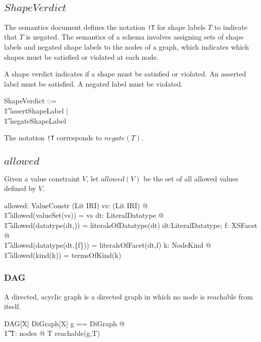 \documentclass{article}
\begin{document}
\subsection{$ShapeVerdict$}
The semantics document defines the notation {\tt !T} for shape labels $T$ to indicate that $T$ is negated.
The semantics of a schema involves assigning sets of shape labels and negated shape labels to the nodes of a graph, 
which indicates which shapes must be satisfied or violated at each node. 

A shape verdict indicates if a shape must be satisfied or violated.
An asserted label must be satisfied.
A negated label must be violated.
\begin{zed}
	ShapeVerdict ::= \\
\t1		assert\ldata ShapeLabel \rdata | \\
\t1		negate\ldata ShapeLabel \rdata
\end{zed}

The notation {\tt !T} corresponds to $negate(T)$.

\subsection{$allowed$}
Given a value constraint $V$, let $allowed(V)$ be the set of all allowed values defined by $V$.
\begin{axdef}
	allowed: ValueConstr \fun \power (Lit \cup IRI)
\where
	\forall vs: \power (Lit \cup IRI) @ \\
\t1		allowed(valueSet(vs)) = vs
\also
	\forall dt: LiteralDatatype @ \\
\t1		allowed(datatype(dt,\emptyset)) = literalsOfDatatype(dt)
\also
	\forall dt:LiteralDatatype; f: XSFacet @ \\
\t1		allowed(datatype(dt,\{f\})) = literalsOfFacet(dt,f)
\also
	\forall k: NodeKind @ \\
\t1		allowed(kind(k)) = termsOfKind(k)
\end{axdef}

\subsubsection{DAG}
A directed, acyclic graph is a directed graph in which no node is reachable from itself.
\begin{schema}{DAG}[X]
	 DiGraph[X]
\where
	\LET g == \theta DiGraph @ \\
\t1		\forall T: nodes @ T \notin reachable(g,T)
\end{schema}
\end{document}
